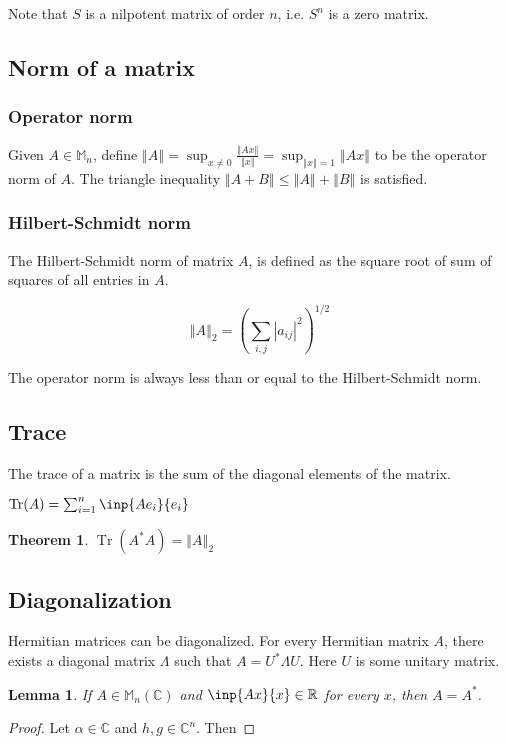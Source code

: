 \documentclass[twofold]{article}
\newcommand*\adj[1]{#1^*}
\newcommand*\norm[1]{\left \Vert #1 \right\Vert}
\newcommand*\abs[1]{\left \vert #1 \right\vert}
\DeclareMathOperator{\Tr}{Tr}
\theoremstyle{plain}
\newtheorem*{theorem}{Theorem}
\newtheorem*{lemma}{Lemma}
\theoremstyle{definition}
\begin{document}
 Note that \(S\) is a nilpotent matrix of order \(n\), i.e. \(S^n\) is a zero matrix.


\subsection{Norm of a matrix}

\subsubsection{Operator norm}
Given \(A \in \mathbb{M}_n\), define \(\norm{A} =\displaystyle \sup _{x \neq 0} \frac{\norm{Ax}}{\norm{x}} = \sup_{\norm{x} = 1} \norm{Ax} \) to be the operator norm of \(A\). The triangle inequality \(\norm{A + B} \leq \norm{A} + \norm{B}\) is satisfied. 

\subsubsection{Hilbert-Schmidt norm}

The Hilbert-Schmidt norm of matrix \(A\), is defined as the square root of sum of squares of all entries in \(A\). 

 \[\norm{A}_2 = \left( \sum_{i, j} \abs{a_{ij}}^2 \right) ^{1/2}\]


The operator norm is always less than or equal to the Hilbert-Schmidt norm.

\subsection{Trace}
The trace of a matrix is the sum of the diagonal elements of the matrix. 

\(\Tr(A) = \sum_{i=1} ^n \inp{Ae_i}{ e_i}\)

\begin{theorem}\(\Tr( \adj{A} A ) = \norm{A}_2\)\end{theorem}

\subsection{Diagonalization}


Hermitian matrices can be diagonalized. For every Hermitian matrix \(A\), there exists a diagonal matrix \(\Lambda\) such that \(A = \adj{U}  \Lambda U\). Here \(U\) is some unitary matrix. 



\begin{lemma} If \(A \in \mathbb{M}_n (\mathbb{C})\) and \(\inp{Ax}{x} \in \mathbb{R}\) for every \(x\), then \(A = \adj{A}\). \end{lemma}
\begin{proof} Let \(\alpha \in \mathbb{C}\) and \(h, g \in \mathbb{C}^n\). Then \end{proof}
\end{document}
